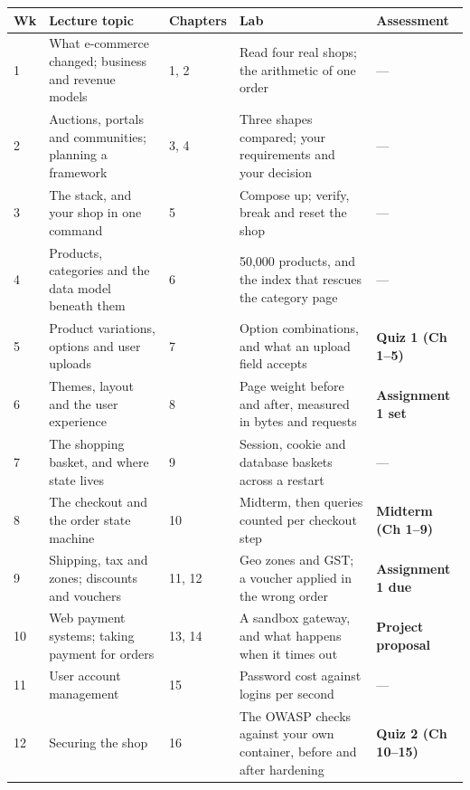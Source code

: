 \begin{longtable}{@{}L{1.1cm}L{3.2cm}L{1.8cm}L{4.4cm}L{3.9cm}@{}}
\toprule
{}
\textbf{Wk} & \textbf{Lecture topic} & \textbf{Chapters} & \textbf{Lab} &
\textbf{Assessment} \\
\midrule
{} & What e-commerce changed; business and revenue models & 1, 2 & Read four
real shops; the arithmetic of one order & --- \\
2 & Auctions, portals and communities; planning a framework & 3, 4 & Three
shapes compared; your requirements and your decision & --- \\
3 & The stack, and your shop in one command & 5 & Compose up; verify, break and
reset the shop & --- \\
4 & Products, categories and the data model beneath them & 6 & 50{,}000
products, and the index that rescues the category page & --- \\
5 & Product variations, options and user uploads & 7 & Option combinations, and
what an upload field accepts & \textbf{Quiz 1 (Ch 1--5)} \\
6 & Themes, layout and the user experience & 8 & Page weight before and after,
measured in bytes and requests & \textbf{Assignment 1 set} \\
7 & The shopping basket, and where state lives & 9 & Session, cookie and
database baskets across a restart & --- \\
8 & The checkout and the order state machine & 10 & Midterm, then queries
counted per checkout step & \textbf{Midterm (Ch 1--9)} \\
9 & Shipping, tax and zones; discounts and vouchers & 11, 12 & Geo zones and
GST; a voucher applied in the wrong order & \textbf{Assignment 1 due} \\
10 & Web payment systems; taking payment for orders & 13, 14 & A sandbox
gateway, and what happens when it times out & \textbf{Project proposal} \\
11 & User account management & 15 & Password cost against logins per second &
--- \\
12 & Securing the shop & 16 & The OWASP checks against your own container,
before and after hardening & \textbf{Quiz 2 (Ch 10--15)} \\

\end{longtable}
